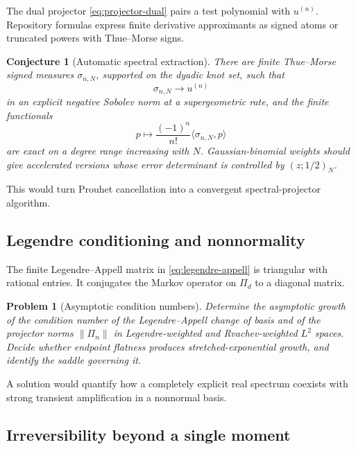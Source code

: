 \documentclass[11pt,a4paper]{article}
\newtheorem{conjecture}[theorem]{Conjecture}
\newtheorem{problem}[theorem]{Problem}
\theoremstyle{definition}
\theoremstyle{remark}
\newcommand{\PiD}{\Pi}
\begin{document}
The dual projector \eqref{eq:projector-dual} pairs a test polynomial with $u^{(n)}$. Repository formulas express finite derivative approximants as signed atoms or truncated powers with Thue--Morse signs.

\begin{conjecture}[Automatic spectral extraction]
There are finite Thue--Morse signed measures $\sigma_{n,N}$, supported on the dyadic knot set, such that
\begin{equation}
 \sigma_{n,N}\longrightarrow u^{(n)}
 \label{eq:sigma-converge}
\end{equation}
in an explicit negative Sobolev norm at a supergeometric rate, and the finite functionals
\begin{equation}
 p\longmapsto\frac{(-1)^n}{n!}\langle\sigma_{n,N},p\rangle
 \label{eq:finite-projector}
\end{equation}
are exact on a degree range increasing with $N$. Gaussian-binomial weights should give accelerated versions whose error determinant is controlled by $(z;1/2)_N$.
\end{conjecture}

This would turn Prouhet cancellation into a convergent spectral-projector algorithm.

\subsection{Legendre conditioning and nonnormality}

The finite Legendre--Appell matrix in \eqref{eq:legendre-appell} is triangular with rational entries. It conjugates the Markov operator on $\Pi_d$ to a diagonal matrix.

\begin{problem}[Asymptotic condition numbers]
Determine the asymptotic growth of the condition number of the Legendre--Appell change of basis and of the projector norms $\|\PiD_n\|$ in Legendre-weighted and Rvachev-weighted $L^2$ spaces. Decide whether endpoint flatness produces stretched-exponential growth, and identify the saddle governing it.
\end{problem}

A solution would quantify how a completely explicit real spectrum coexists with strong transient amplification in a nonnormal basis.

\subsection{Irreversibility beyond a single moment}
\end{document}
